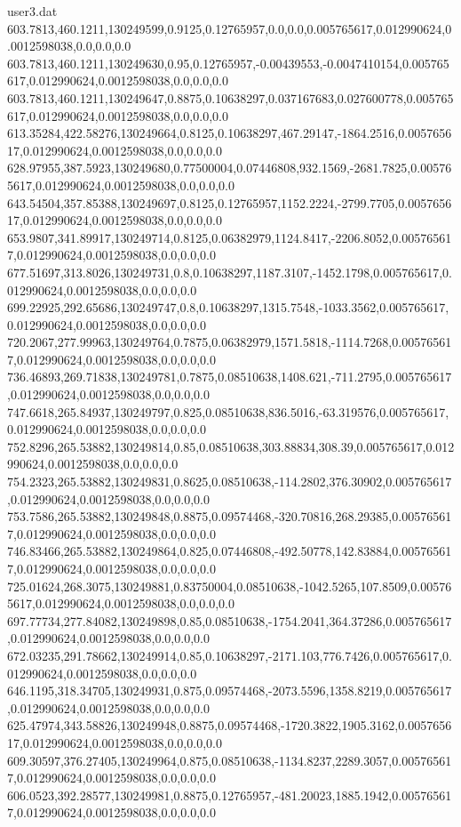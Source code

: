 \begin{filecontents}{user3.dat}
603.7813,460.1211,130249599,0.9125,0.12765957,0.0,0.0,0.005765617,0.012990624,0.0012598038,0.0,0.0,0.0
603.7813,460.1211,130249630,0.95,0.12765957,-0.00439553,-0.0047410154,0.005765617,0.012990624,0.0012598038,0.0,0.0,0.0
603.7813,460.1211,130249647,0.8875,0.10638297,0.037167683,0.027600778,0.005765617,0.012990624,0.0012598038,0.0,0.0,0.0
613.35284,422.58276,130249664,0.8125,0.10638297,467.29147,-1864.2516,0.005765617,0.012990624,0.0012598038,0.0,0.0,0.0
628.97955,387.5923,130249680,0.77500004,0.07446808,932.1569,-2681.7825,0.005765617,0.012990624,0.0012598038,0.0,0.0,0.0
643.54504,357.85388,130249697,0.8125,0.12765957,1152.2224,-2799.7705,0.005765617,0.012990624,0.0012598038,0.0,0.0,0.0
653.9807,341.89917,130249714,0.8125,0.06382979,1124.8417,-2206.8052,0.005765617,0.012990624,0.0012598038,0.0,0.0,0.0
677.51697,313.8026,130249731,0.8,0.10638297,1187.3107,-1452.1798,0.005765617,0.012990624,0.0012598038,0.0,0.0,0.0
699.22925,292.65686,130249747,0.8,0.10638297,1315.7548,-1033.3562,0.005765617,0.012990624,0.0012598038,0.0,0.0,0.0
720.2067,277.99963,130249764,0.7875,0.06382979,1571.5818,-1114.7268,0.005765617,0.012990624,0.0012598038,0.0,0.0,0.0
736.46893,269.71838,130249781,0.7875,0.08510638,1408.621,-711.2795,0.005765617,0.012990624,0.0012598038,0.0,0.0,0.0
747.6618,265.84937,130249797,0.825,0.08510638,836.5016,-63.319576,0.005765617,0.012990624,0.0012598038,0.0,0.0,0.0
752.8296,265.53882,130249814,0.85,0.08510638,303.88834,308.39,0.005765617,0.012990624,0.0012598038,0.0,0.0,0.0
754.2323,265.53882,130249831,0.8625,0.08510638,-114.2802,376.30902,0.005765617,0.012990624,0.0012598038,0.0,0.0,0.0
753.7586,265.53882,130249848,0.8875,0.09574468,-320.70816,268.29385,0.005765617,0.012990624,0.0012598038,0.0,0.0,0.0
746.83466,265.53882,130249864,0.825,0.07446808,-492.50778,142.83884,0.005765617,0.012990624,0.0012598038,0.0,0.0,0.0
725.01624,268.3075,130249881,0.83750004,0.08510638,-1042.5265,107.8509,0.005765617,0.012990624,0.0012598038,0.0,0.0,0.0
697.77734,277.84082,130249898,0.85,0.08510638,-1754.2041,364.37286,0.005765617,0.012990624,0.0012598038,0.0,0.0,0.0
672.03235,291.78662,130249914,0.85,0.10638297,-2171.103,776.7426,0.005765617,0.012990624,0.0012598038,0.0,0.0,0.0
646.1195,318.34705,130249931,0.875,0.09574468,-2073.5596,1358.8219,0.005765617,0.012990624,0.0012598038,0.0,0.0,0.0
625.47974,343.58826,130249948,0.8875,0.09574468,-1720.3822,1905.3162,0.005765617,0.012990624,0.0012598038,0.0,0.0,0.0
609.30597,376.27405,130249964,0.875,0.08510638,-1134.8237,2289.3057,0.005765617,0.012990624,0.0012598038,0.0,0.0,0.0
606.0523,392.28577,130249981,0.8875,0.12765957,-481.20023,1885.1942,0.005765617,0.012990624,0.0012598038,0.0,0.0,0.0

\end{filecontents}
